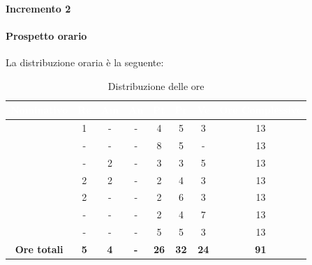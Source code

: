 \paragraph{Incremento 2}
\paragraph*{Prospetto orario}
La distribuzione oraria è la seguente:
\begin{table}[H]
	\begin{center}
		\begin{tabular}{ |c c c c c c c c| }
			\rowcolor{darkblue} 
			\textcolor{white}{\textbf{Nominativo}} & \textcolor{white}{\textbf{Re}} & \textcolor{white}{\textbf{Am}} & \textcolor{white}{\textbf{An}} & \textcolor{white}{\textbf{Pt}} & \textcolor{white}{\textbf{Pr}} & \textcolor{white}{\textbf{Ve}} & \textcolor{white}{\textbf{Ore Complessive}} \\ \hline
			\BL 	& 1  	& -  	& - 	& 4 	& 5 	& 3 	& 13 \\ \hline
			\FF 	& -  	& -  	& - 	& 8 	& 5 	& -  	& 13 \\ \hline
			\MM 	& -  	& 2  	& - 	& 3 	& 3 	& 5 	& 13 \\ \hline
			\PC 	& 2 	& 2  	& - 	& 2		& 4 	& 3 	& 13 \\ \hline
			\TG 	& 2  	& -		& - 	& 2 	& 6 	& 3 	& 13 \\ \hline
			\TL 	& -  	& - 	& - 	& 2 	& 4 	& 7 	& 13 \\ \hline
			\VD 	& -  	& -  	& - 	& 5 	& 5 	& 3 	& 13 \\ \hline
			\textbf{Ore totali} & \textbf{5} & \textbf{4} & \textbf{-} & \textbf{26} & \textbf{32} & \textbf{24} & \textbf{91} \\ \hline
		\end{tabular}
		\caption{Distribuzione delle ore}
	\end{center}
\end{table}
